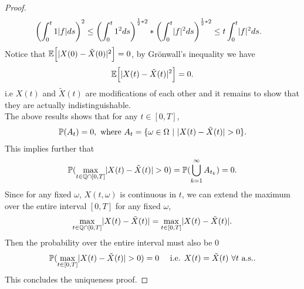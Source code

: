 \begin{proof}
\begin{align*}
   \left( \int_0^{t} 1 \lvert f\rvert ds  \right)^2 &\le  \left( \int_0^{t} 1^2 ds  \right)^{\frac{1}{2}*2}*\left( \int_0^{t} \lvert f\rvert^2 ds  \right)^{\frac{1}{2}*2} \le t \int_0^{t} \lvert f\rvert^2 ds 
 .\end{align*}
Notice that $\mathbb{E}\Big[\lvert X(0)-\tilde{X}(0)\rvert^2\Big]=0$, by Grönwall's inequality we have 
 \begin{align*}
   \mathbb{E}\Big[\lvert X(t)-\tilde{X}(t) \rvert^2\Big] = 0
 .\end{align*}
 i.e $X(t)$ and $\tilde{X}(t) $ are modifications of each other and it remains to show that they are actually
 indistinguishable.\\[1ex]
The above results shows that for any $t\in [0,T]$,
 \begin{align*}
 \P(A_t) = 0, \mbox{ where } A_t = \{ \omega  \in  \Omega  \ | \ \abs{X(t) - \tilde{X}(t)  } > 0\}
 .\end{align*}
 This implies further that
 \begin{align*}
   \mathbb{P}(\max_{t \in  \mathbb{Q} \cap [0,T]} \lvert X(t)-\tilde{X}(t) \rvert > 0 ) = \mathbb{P}(\bigcup_{k=1}^{\infty} A_{t_k} ) = 0
 .\end{align*}
Since for any fixed $\omega$, $X(t,\omega )$ is continuous in $t$, we can extend the maximum over the entire interval $[0,T]$ for any fixed $\omega$,
 \begin{align*}
   \max_{t \in  \mathbb{Q} \cap [0,T]} \lvert X(t) - \tilde{X}(t)\rvert = \max_{t \in  [0,T]} \lvert X(t) - \tilde{X}(t)\rvert
 .\end{align*}
 Then the probability over the entire interval must also be 0 
 \begin{align*}
   \mathbb{P}(\max_{t \in  [0,T]} \lvert X(t) - \tilde{X}(t)\rvert >0)  = 0 \quad \text{ i.e. } X(t) = \tilde{X}(t) \ \forall  t \text{ a.s.} 
 .\end{align*}
 This concludes the uniqueness proof.
 

\end{proof}
